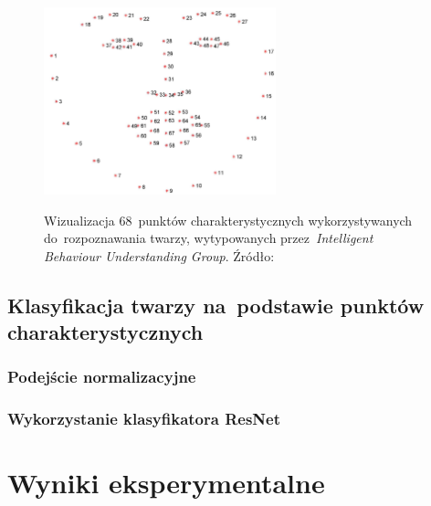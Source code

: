 \documentclass[11pt,a4paper]{article}
\begin{document}
\begin{figure}[H]
    \centering
    \includegraphics[width=0.6\textwidth]{res/img/figure_68_markup.jpg}
    \label{fig:68-landmarks}
    \caption{Wizualizacja 68~punktów charakterystycznych wykorzystywanych do~rozpoznawania twarzy, wytypowanych przez~\emph{Intelligent Behaviour Understanding Group}. Źródło: \cite{sagonas2013}}
\end{figure}

\subsection{Klasyfikacja twarzy na~podstawie punktów charakterystycznych}
\label{subsec:classification}

\subsubsection{Podejście normalizacyjne}

\subsubsection{Wykorzystanie klasyfikatora ResNet}

\section{Wyniki eksperymentalne}
\label{sec:results}
\end{document}
